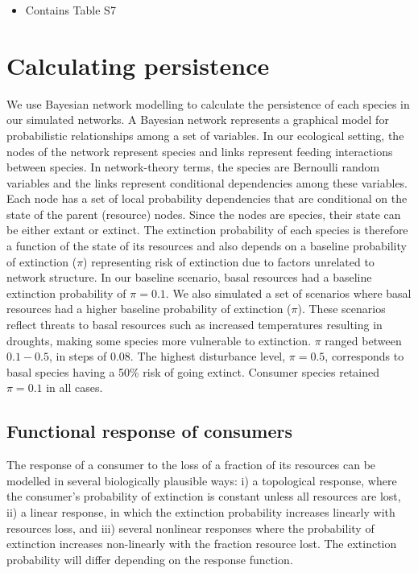 \documentclass[12pt]{article}
\begin{document}
\begin{spacing}{2.0}
{\begin{spacing}{1.0}
\begin{enumerate}
            \begin{itemize}
                \item Contains Table S7
            \end{itemize}


    \end{enumerate}    
\end{spacing}
}
\clearpage

\linenumbers
\section{Calculating persistence}        

        We use Bayesian network modelling to calculate the persistence of each species in our simulated networks. 
        A Bayesian network represents a graphical model for probabilistic relationships among a set of variables. 
        In our ecological setting, the nodes of the network represent species and links represent feeding interactions between species.
        In network-theory terms, the species are Bernoulli random variables and the links represent conditional dependencies among these variables. 
        Each node has a set of local probability dependencies that are conditional on the state of the parent (resource) nodes. 
        Since the nodes are species, their state can be either extant or extinct.
        The extinction probability of each species is therefore a function of the state of its resources and also depends on a baseline probability of extinction ($\pi$) representing risk of extinction due to factors unrelated to network structure.
        In our baseline scenario, basal resources had a baseline extinction probability of $\pi = 0.1$. 
        We also simulated a set of scenarios where basal resources had a higher baseline probability of extinction ($\pi$). 
        These scenarios reflect threats to basal resources such as increased temperatures resulting in droughts, making some species more vulnerable to extinction.
        $\pi$ ranged between $0.1-0.5$, in steps of $0.08$. 
        The highest disturbance level, $\pi = 0.5$, corresponds to basal species having a 50\% risk of going extinct. 
        Consumer species retained $\pi=0.1$ in all cases.


    \subsection{Functional response of consumers}

        The response of a consumer to the loss of a fraction of its resources can be modelled in several biologically plausible ways: i) a topological response, where the consumer's probability of extinction is constant unless all resources are lost, ii) a linear response, in which the extinction probability increases linearly with resources loss, and iii) several nonlinear responses where the probability of extinction increases non-linearly with the fraction resource lost. 
        The extinction probability will differ depending on the response function.
        

\end{spacing}
\end{document}
